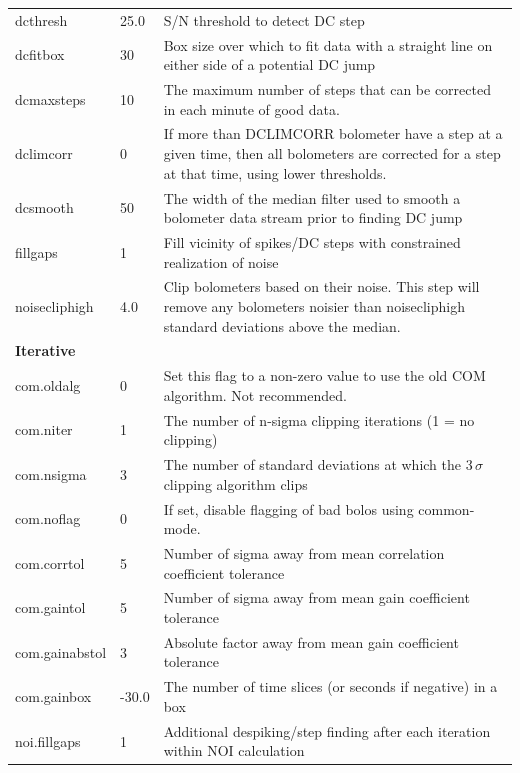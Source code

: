 \documentclass[twoside,11pt]{article}
\newenvironment{latexonly}{}{}
\renewcommand{\_}{\texttt{\symbol{95}}}
\begin{document}
\begin{latexonly}
\begin{table}
\begin{center}
\begin{footnotesize}
\begin{tabular}{|p{2.2cm}|p{1.1cm}|p{11.4cm}|}
dcthresh      &  25.0 & S/N threshold to detect DC step\\
dcfitbox      &    30 & Box size over which to fit data with a straight
                        line on either side of a potential DC jump\\
dcmaxsteps    &    10 & The maximum number of steps that can be corrected
                        in each minute of good data.\\
dclimcorr     &     0 & If more than DCLIMCORR bolometer have a step at
                        a given time, then all bolometers are corrected for
                        a step at that time, using lower thresholds.\\
dcsmooth      &    50 & The width of the median filter used to smooth a
                        bolometer data stream prior to finding DC jump\\
fillgaps      &     1 & Fill vicinity of spikes/DC steps with constrained
                        realization of noise\\
noisecliphigh &   4.0 & Clip bolometers based on their noise. This step
                        will remove any bolometers noisier than noisecliphigh
                        standard deviations above the median.\\
\hline
\multicolumn{3}{|l|}{\textbf{Iterative}}\\
\hline
com.oldalg       &    0 & Set this flag to a non-zero value to use the old COM
                          algorithm. Not recommended.\\
com.niter        &    1 & The number of n-sigma clipping iterations (1 = no clipping)\\
com.nsigma       &    3 & The number of standard deviations at which the 3\,$\sigma$
                           clipping algorithm clips\\
com.noflag       &    0 & If set, disable flagging of bad bolos using common-mode.\\
com.corr\_tol    &    5 & Number of sigma away from mean correlation coefficient tolerance\\
com.gain\_tol    &    5 & Number of sigma away from mean gain coefficient tolerance\\
com.gain\_abstol &    3 & Absolute factor away from mean gain coefficient tolerance\\
com.gain\_box    &-30.0 & The number of time slices (or seconds if negative)
                          in a box\\
\hline
noi.fillgaps     &    1 & Additional despiking/step finding after each iteration within NOI calculation\\

\end{tabular}
\end{footnotesize}
\end{center}
\end{table}
\end{latexonly}
\end{document}
